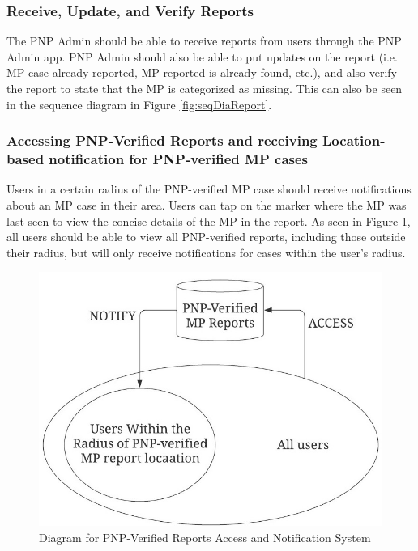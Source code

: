 \subsubsection{Receive, Update, and Verify Reports}

The PNP Admin should be able to receive reports from users through the PNP Admin app. PNP Admin should also be able to put updates on the report (i.e. MP case already reported, MP reported is already found, etc.), and also verify the report to state that the MP is categorized as missing. This can also be seen in the sequence diagram in Figure \ref{fig:seqDiaReport}. 

\subsubsection{Accessing PNP-Verified Reports and receiving Location-based notification for PNP-verified MP cases}

Users in a certain radius of the PNP-verified MP case  should receive notifications about an MP case in their area. Users can tap on the marker where the MP was last seen to view the concise details of the MP in the report. As seen in Figure \ref{fig:diagramLocation}, all users should be able to view all PNP-verified reports, including those outside their radius, but will only receive notifications for cases within the user's radius.

\begin{figure}[!h]
    \centering
    \includegraphics[scale = 1.50]{figures/Chapter3/Chapt3_Diag_locationBasedNotif.jpeg}
    \caption{Diagram for PNP-Verified Reports Access and Notification System}
    \label{fig:diagramLocation}
\end{figure}

